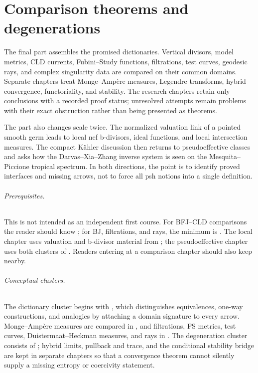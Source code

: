 \part{Comparison theorems and degenerations}
\label{part:comparisons}

The final part assembles the promised dictionaries.  Vertical divisors,
model metrics, CLD currents, Fubini--Study functions, filtrations, test
curves, geodesic rays, and complex singularity data are compared on their
common domains.  Separate chapters treat Monge--Amp\`ere measures, Legendre
transforms, hybrid convergence, functoriality, and stability.  The research
chapters retain only conclusions with a recorded proof status; unresolved
attempts remain problems with their exact obstruction rather than being
presented as theorems.

The part also changes scale twice.  The normalized valuation link of a
pointed smooth germ leads to local nef b-divisors, ideal functions, and local
intersection measures.  The compact K\"ahler discussion then returns to
pseudoeffective classes and asks how the Darvas--Xia--Zhang inverse system is
seen on the Mesquita--Piccione tropical spectrum.  In both directions, the
point is to identify proved interfaces and missing arrows, not to force all
psh notions into a single definition.

\paragraph{Prerequisites.}
\label{front:part6-prerequisites}
This is not intended as an independent first course.  For BFJ--CLD
comparisons the reader should know
; for
BJ, filtrations, and rays, the minimum is
.
The local chapter uses valuation and b-divisor material from
; the pseudoeffective chapter
uses both clusters of .  Readers entering at a comparison
chapter should also keep  nearby.

\paragraph{Conceptual clusters.}
\label{front:part6-conceptual-clusters}
The dictionary cluster begins with , which
distinguishes equivalences, one-way constructions, and analogies by attaching
a domain signature to every arrow.  Monge--Amp\`ere measures are compared in
, and filtrations, FS metrics, test curves,
Duistermaat--Heckman measures, and rays in .  The
degeneration cluster consists of
; hybrid
limits, pullback and trace, and the conditional stability bridge are kept in
separate chapters so that a convergence theorem cannot silently supply a
missing entropy or coercivity statement.

